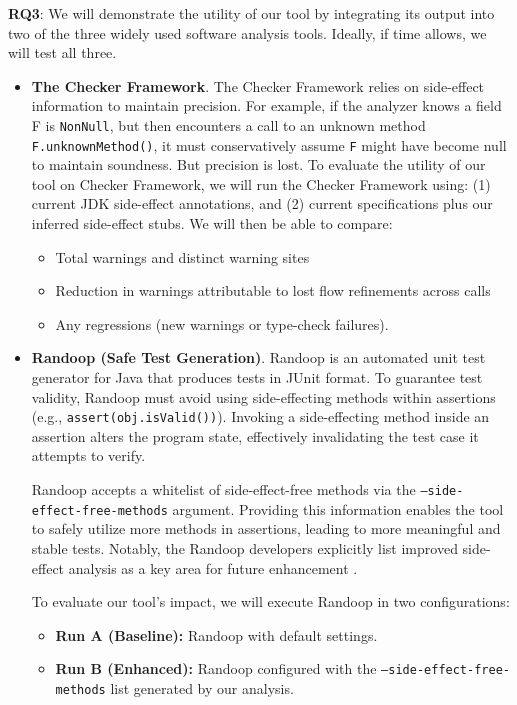\textbf{RQ3}: We will demonstrate the utility of our tool by integrating its output into two of the three widely used software analysis tools. Ideally, if time allows, we will test all three. 
\begin{itemize}
    \item \textbf{The Checker Framework}. The Checker Framework relies on side-effect information to maintain precision. For example, if the analyzer knows a field F is \texttt{NonNull}, but then encounters a call to an unknown method \texttt{F.unknownMethod()}, it must conservatively assume \texttt{F} might have become null to maintain soundness. But precision is lost. 
    To evaluate the utility of our tool on Checker Framework, we will run the Checker Framework using: (1) current JDK side-effect annotations, and (2) current specifications plus our inferred side-effect stubs. We will then be able to compare:
\begin{itemize}
    \item Total warnings and distinct warning sites
    \item Reduction in warnings attributable to lost flow refinements across calls
    \item Any regressions (new warnings or type-check failures).
\end{itemize}

\item \textbf{Randoop (Safe Test Generation)}. Randoop is an automated unit test generator for Java that produces tests in JUnit format. To guarantee test validity, Randoop must avoid using side-effecting methods within assertions (e.g., \texttt{assert(obj.isValid())}). Invoking a side-effecting method inside an assertion alters the program state, effectively invalidating the test case it attempts to verify.

Randoop accepts a whitelist of side-effect-free methods via the \texttt{--side-effect-free-methods} argument. Providing this information enables the tool to safely utilize more methods in assertions, leading to more meaningful and stable tests. Notably, the Randoop developers explicitly list improved side-effect analysis as a key area for future enhancement \cite{RandoopProjectIdeas}.

To evaluate our tool's impact, we will execute Randoop in two configurations: \begin{itemize} \item \textbf{Run A (Baseline):} Randoop with default settings. \item \textbf{Run B (Enhanced):} Randoop configured with the \texttt{--side-effect-free-methods} list generated by our analysis. \end{itemize}


\end{itemize}
